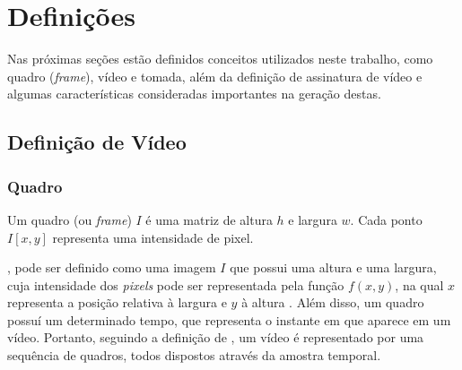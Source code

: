 



\chapter{Definições}
\label{chap:definicoes}

	Nas próximas seções estão definidos conceitos utilizados neste trabalho, como quadro (\textit{frame}), vídeo e tomada, além da definição de assinatura de vídeo e algumas características consideradas importantes na geração destas. 
    
  	\section{Definição de Vídeo}
    \label{sec:video}
    
    \subsection*{Quadro}
    \label{subsec:quadro}
    Um quadro (ou \textit{frame}) $I$ é uma matriz de altura $h$ e largura $w$. Cada ponto $I[x,y]$ representa uma intensidade de pixel.
    
    , pode ser definido como uma imagem $I$ que possui uma altura e uma largura, cuja intensidade dos \textit{pixels} pode ser representada pela função $f(x,y)$, na qual $x$ representa a posição relativa à largura e $y$ à altura \citeauthor{simoes2004detecccao}. Além disso, um quadro possuí um determinado tempo, que representa o instante em que aparece em um vídeo. Portanto, seguindo a definição de \citeauthor{simoes2004detecccao}, um vídeo é representado por uma sequência de quadros, todos dispostos através da amostra temporal.
    
